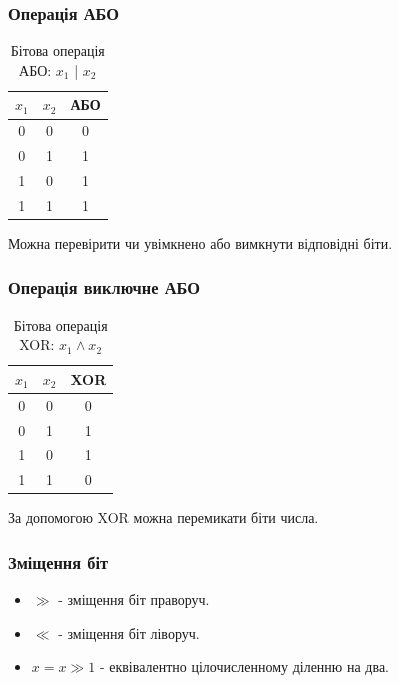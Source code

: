 \begin{frame}
\frametitle{Операція АБО}

\begin{table}
  \caption{Бітова операція АБО: $x_1$ | $x_2$}
  \label{tab:}

  \begin{center}
    \begin{tabular}{|c|c|c|}
    \hline
      \textbf{$x_1$} & \textbf{$x_2$} &  \textbf{АБО} \\
    \hline
      0 & 0 & 0 \\
    \hline
      0 & 1 & 1 \\
    \hline
      1 & 0 & 1 \\
    \hline
      1 & 1 & 1 \\
    \hline
    \end{tabular}
  \end{center}
\end{table}

Можна перевірити чи увімкнено або вимкнути відповідні біти.

\end{frame}

\begin{frame}
\frametitle{Операція виключне АБО}

\begin{table}
  \caption{Бітова операція XOR: $x_1 \wedge x_2$}
  \label{tab:}

  \begin{center}
    \begin{tabular}{|c|c|c|}
    \hline
      \textbf{$x_1$} & \textbf{$x_2$} &  \textbf{XOR} \\
    \hline
      0 & 0 & 0 \\
    \hline
      0 & 1 & 1 \\
    \hline
      1 & 0 & 1 \\
    \hline
      1 & 1 & 0 \\
    \hline
    \end{tabular}
  \end{center}
\end{table}

За допомогою XOR можна перемикати біти числа.

\end{frame}

\begin{frame}
\frametitle{Зміщення біт}

\begin{itemize}
  \item $\gg$ - зміщення біт праворуч.
  \item  $\ll$  - зміщення біт ліворуч.

  \item $x = x \gg 1$ - еквівалентно цілочисленному діленню на два.

\end{itemize}


\end{frame}

